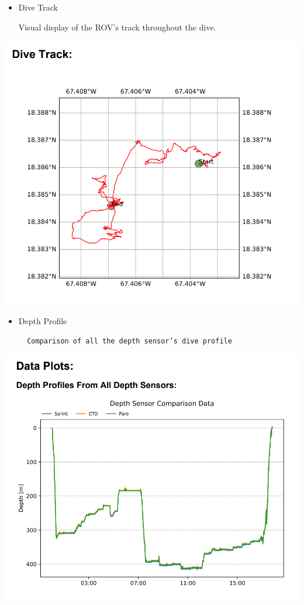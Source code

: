 \documentclass[
  letterpaper,
  DIV=11,
  numbers=noendperiod]{scrreprt}
\begin{document}
\begin{itemize}
\item
  Dive Track

  Visual display of the ROV's track throughout the dive.
\end{itemize}

\includegraphics{images/image25.png}

\begin{itemize}
\item
  Depth Profile

\begin{verbatim}
  Comparison of all the depth sensor’s dive profile
\end{verbatim}
\end{itemize}

\includegraphics{images/image13.png}
\end{document}
